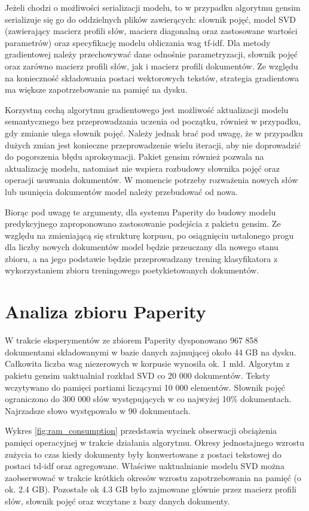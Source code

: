\documentclass{pracamgr}
\begin{document}
Jeżeli chodzi o możliwości serializacji modelu, to w przypadku algorytmu gensim serializuje się go do oddzielnych plików zawierących: słownik pojęć, model SVD (zawierający macierz profili słów, macierz diagonalną oraz zastosowane wartości parametrów) oraz specyfikację modelu obliczania wag tf-idf. Dla metody gradientowej należy przechowywać dane odnośnie parametryzacji, słownik pojęć oraz zarówno macierz profili słów, jak i macierz profili dokumentów. Ze względu na konieczność składowania postaci wektorowych tekstów, strategia gradientowa ma większe zapotrzebowanie na pamięć na dysku.

Korzystną cechą algorytmu gradientowego jest możliwość aktualizacji modelu semantycznego bez przeprowadzania uczenia od początku, również w przypadku, gdy zmianie ulega słownik pojęć. Należy jednak brać pod uwagę, że w przypadku dużych zmian jest konieczne przeprowadzenie wielu iteracji, aby nie doprowadzić do pogorszenia błędu aproksymacji. Pakiet gensim również pozwala na aktualizację modelu, natomiast nie wspiera rozbudowy słownika pojęć oraz operacji usuwania dokumentów. W momencie potrzeby rozważenia nowych słów lub usunięcia dokumentów model należy przebudować od nowa.

Biorąc pod uwagę te argumenty, dla systemu Paperity do budowy modelu predykcyjnego zaproponowano zastosowanie podejścia z pakietu gensim. Ze względu na zmieniającą się strukturę korpusu, po osiągnięciu ustalonego progu dla liczby nowych dokumentów model będzie przeuczany dla nowego stanu zbioru, a na jego podstawie będzie przeprowadzany trening klasyfikatora z wykorzystaniem zbioru treningowego poetykietowanych dokumentów.

\section{Analiza zbioru Paperity}

W trakcie eksperymentów ze zbiorem Paperity dysponowano 967 858 dokumentami składowanymi w bazie danych zajmującej około 44 GB na dysku. Całkowita liczba wag niezerowych w korpusie wynosiła ok. 1 mld. Algorytm z pakietu gensim uaktualniał rozkład SVD co 20 000 dokumentów. Teksty wczytywano do pamięci partiami liczącymi 10 000 elementów. Słownik pojęć ograniczono do 300 000 słów występujących w co najwyżej 10\% dokumentach. Najrzadsze słowo występowało w 90 dokumentach.

Wykres \ref{fig:ram_consumption} przedstawia wycinek obserwacji obciążenia pamięci operacyjnej w trakcie działania algorytmu. Okresy jednostajnego wzrostu zużycia to czas kiedy dokumenty były konwertowane z postaci tekstowej do postaci td-idf oraz agregowane. Właściwe uaktualnianie modelu SVD można zaobserwować w trakcie krótkich okresów wzrostu zapotrzebowania na pamięć (o ok. 2.4 GB). Pozostałe ok 4.3 GB było zajmowane głównie przez macierz profili słów, słownik pojęć oraz wczytane z bazy danych dokumenty. 
\end{document}
